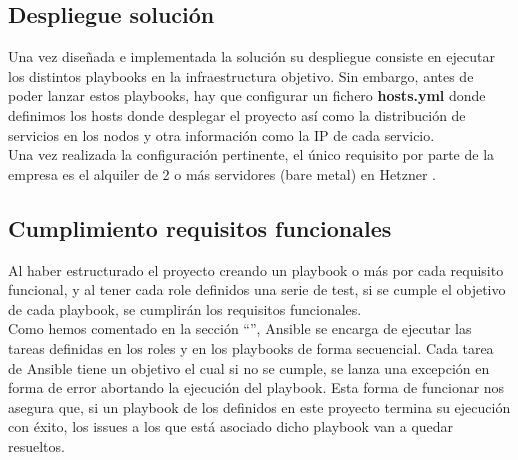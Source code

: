\subsection{Despliegue solución}
\begin{text}
	Una vez diseñada e implementada la solución su despliegue consiste en ejecutar los distintos playbooks en la infraestructura objetivo. Sin embargo, antes de poder lanzar estos playbooks, hay que configurar un fichero \textbf{hosts.yml} donde definimos los hosts donde desplegar el proyecto así como la distribución de servicios en los nodos y otra información como la IP de cada servicio. \\
	Una vez realizada la configuración pertinente, el único requisito por parte de la empresa es el alquiler de 2 o más servidores (bare metal) en Hetzner \cite{hetzner:online}.
\end{text}

\subsection{Cumplimiento requisitos funcionales}
\begin{text}
	Al haber estructurado el proyecto creando un playbook o más por cada requisito funcional, y al tener cada role definidos una serie de test, si se cumple el objetivo de cada playbook, se cumplirán los requisitos funcionales. \\
	Como hemos comentado en la sección ``'', Ansible se encarga de ejecutar las tareas definidas en los roles y en los playbooks de forma secuencial. Cada tarea de Ansible tiene un objetivo el cual si no se cumple, se lanza una excepción en forma de error abortando la ejecución del playbook. Esta forma de funcionar nos asegura que, si un playbook de los definidos en este proyecto termina su ejecución con éxito, los issues a los que está asociado dicho playbook van a quedar resueltos.
\end{text}


